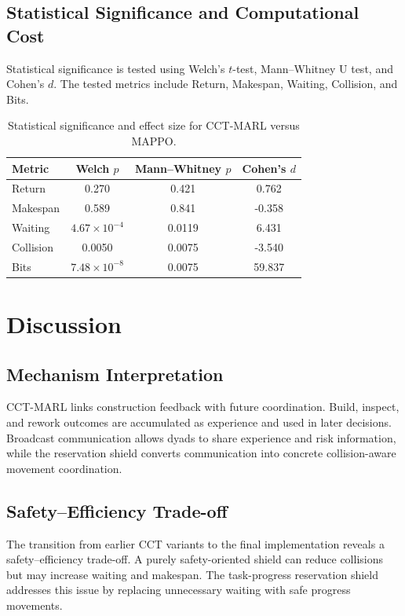 \documentclass[preprint,12pt]{elsarticle}
\begin{document}
\subsection{Statistical Significance and Computational Cost}
Statistical significance is tested using Welch's $t$-test, Mann--Whitney U test, and Cohen's $d$. The tested metrics include Return, Makespan, Waiting, Collision, and Bits.

\begin{table}[htbp]
\centering
\caption{Statistical significance and effect size for CCT-MARL versus MAPPO.}
\label{tab:stats}
\begin{tabular}{lccc}
\toprule
Metric & Welch $p$ & Mann--Whitney $p$ & Cohen's $d$ \\
\midrule
Return & 0.270 & 0.421 & 0.762 \\
Makespan & 0.589 & 0.841 & -0.358 \\
Waiting & $4.67\times10^{-4}$ & 0.0119 & 6.431 \\
Collision & 0.0050 & 0.0075 & -3.540 \\
Bits & $7.48\times10^{-8}$ & 0.0075 & 59.837 \\
\bottomrule
\end{tabular}
\end{table}

\section{Discussion}

\subsection{Mechanism Interpretation}

CCT-MARL links construction feedback with future coordination. Build, inspect, and rework outcomes are accumulated as experience and used in later decisions. Broadcast communication allows dyads to share experience and risk information, while the reservation shield converts communication into concrete collision-aware movement coordination.

\subsection{Safety--Efficiency Trade-off}

The transition from earlier CCT variants to the final implementation reveals a safety--efficiency trade-off. A purely safety-oriented shield can reduce collisions but may increase waiting and makespan. The task-progress reservation shield addresses this issue by replacing unnecessary waiting with safe progress movements.
\end{document}
